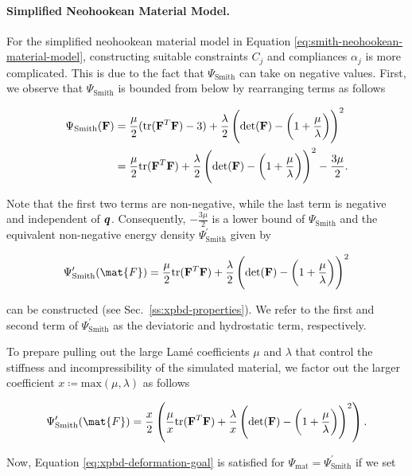 \paragraph{Simplified Neohookean Material Model.}
For the simplified neohookean material model in Equation \ref{eq:smith-neohookean-material-model}, constructing suitable constraints 
$C_j$ and compliances $\alpha_j$ is more complicated. This is due to the fact that $\Psi_{\text{Smith}}$ can take on 
negative values. First, we observe that $\Psi_{\text{Smith}}$ is bounded from below by rearranging terms as follows

\begin{align*}
    \Psi_{\text{Smith}}(\mathbf{F}) &= \frac{\mu}{2}(\text{tr}(\mathbf{F}^T\mathbf{F}) - 3) + \frac{\lambda}{2}\left(\text{det}(\mathbf{F}) - 
    \left(1 + \frac{\mu}{\lambda}\right)\right)^2\\
                                  &= \frac{\mu}{2}\text{tr}(\mathbf{F}^T\mathbf{F}) + \frac{\lambda}{2}\left(\text{det}(\mathbf{F}) - 
                                  \left(1 + \frac{\mu}{\lambda}\right)\right)^2 - \frac{3\mu}{2}.
\end{align*}

\noindent Note that the first two terms are non-negative, while the last term is negative and independent of 
$\bm{q}$. Consequently, $-\frac{3\mu}{2}$ is a lower bound of $\Psi_{\text{Smith}}$ and the equivalent 
non-negative energy density $\Psi^\prime_{\text{Smith}}$ given by

\[
    \Psi^\prime_{\text{Smith}}(\mat{F}) = \frac{\mu}{2}\text{tr}(\matm{F}^T\matm{F})     
    + \frac{\lambda}{2}\left(\text{det}(\matm{F}) - \left(1 + \frac{\mu}{\lambda}\right)\right)^2
\]

\noindent can be constructed (see Sec.\ \ref{ss:xpbd-properties}). We refer to the first and second term of 
$\Psi^\prime_{\text{Smith}}$ as the deviatoric and hydrostatic term, respectively.

To prepare pulling out the large Lamé coefficients $\mu$ and $\lambda$ that 
control the stiffness and incompressibility of the simulated material, we factor out the larger coefficient 
$x \coloneqq \text{max}(\mu, \lambda)$ as follows

\[
    \Psi^\prime_{\text{Smith}}(\mat{F}) = \frac{x}{2} \left(\frac{\mu}{x}\text{tr}(\matm{F}^T\matm{F})     
    + \frac{\lambda}{x}\left(\text{det}(\matm{F}) - \left(1 + \frac{\mu}{\lambda}\right)\right)^2\right).
\]

\noindent Now, Equation \ref{eq:xpbd-deformation-goal} is satisfied for $\Psi_{\text{mat}} = \Psi^\prime_{\text{Smith}}$ if 
we set


